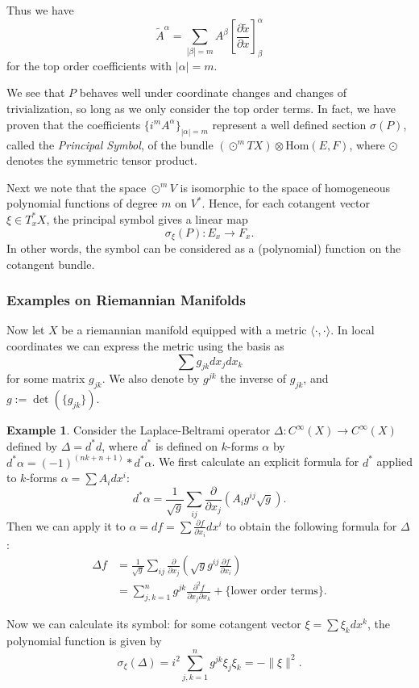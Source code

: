 \documentclass[14pt, reqno]{extarticle}
\theoremstyle{plain}
\theoremstyle{definition}
\newtheorem*{example}{Example}
\theoremstyle{remark}
\begin{document}
Thus we have 
\[
    \tilde{A}^\alpha = \sum_{|\beta| = m} A^\beta \left[ \frac{\partial{\tilde{x}}}{\partial x}\right]^\alpha_\beta
\]
for the top order coefficients with $|\alpha| = m$. 

We see that $P$ behaves well under coordinate changes and changes of trivialization, so long as we only 
consider the top order terms. In fact, we have proven that the coefficients $\{i^m A^\alpha\}_{|\alpha| = m}$
represent a well defined section $\sigma(P)$, called 
the \textit{Principal Symbol}, of the bundle $(\odot^m TX) \otimes \text{Hom}(E,F)$, where
$\odot$ denotes the symmetric tensor product. 

Next we note that the space $\odot^m V$ is isomorphic to the space of homogeneous polynomial
functions of degree $m$ on $V^*$. Hence, for each cotangent vector $\xi \in T_x^* X$, the principal 
symbol gives a linear map 
\[
    \sigma_\xi(P): E_x \to F_x.
\]
In other words, the symbol can be considered as a (polynomial) function on the cotangent bundle. 



\subsubsection{Examples on Riemannian Manifolds}

Now let $X$ be a riemannian manifold equipped with a metric $\langle\cdot,\cdot\rangle$. In local 
coordinates we can express the metric using the basis as
\[
    \sum g_{jk}dx_j dx_k
\]
for some matrix $g_{jk}$. We also denote by $g^{jk}$ the inverse of $g_{jk}$, and $g := \det(\{g_{jk}\})$.

\begin{example}
    Consider the Laplace-Beltrami operator $\Delta: C^\infty(X) \to C^\infty(X)$ defined by $\Delta = d^*d$, where
    $d^*$ is defined on $k$-forms $\alpha$ by $d^*\alpha = (-1)^{(nk+n+1)}*d^*\alpha$. We first calculate 
    an explicit formula for $d^*$ applied to $k$-forms $\alpha = \sum A_i dx^i$:
    \[
        d^*\alpha = \frac{1}{\sqrt{g}}\sum_{ij}\frac{\partial}{\partial x_j}(A_i g^{ij}\sqrt{g}).
    \]
    Then we can apply it to $\alpha = df = \sum \frac{\partial f}{\partial x_i} dx^i$ to obtain the following formula for $\Delta$:
    \begin{align}
        \Delta f & = \frac{1}{\sqrt{g}}\sum_{ij}\frac{\partial}{\partial x_j}(\sqrt{g} g^{ij} \frac{\partial f}{\partial x_i} )\\
        & = \sum_{j,k=1}^n g^{jk} \frac{\partial^2 f}{\partial x_j \partial x_k} + \{\text{lower order terms}\}.
    \end{align}

    Now we can calculate its symbol: for some cotangent vector $\xi = \sum \xi_k dx^k$, the polynomial
    function is given by
    \[
        \sigma_\xi(\Delta) = i^2 \sum_{j,k = 1}^n g^{jk} \xi_j \xi_k = -\|\xi\|^2.
    \]
\end{example}
\end{document}
